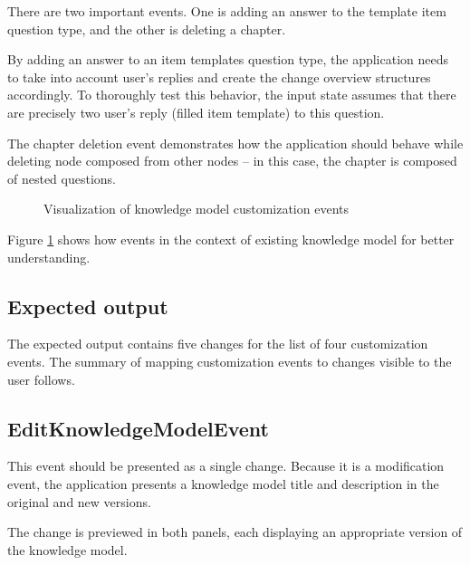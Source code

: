 There are two important events.
One is adding an answer to the template item question type, and the other is deleting a chapter.

By adding an answer to an item templates question type, the application needs to take into account user's replies and create the change overview structures accordingly.
To thoroughly test this behavior, the input state assumes that there are precisely two user's reply (filled item template) to this question.

The chapter deletion event demonstrates how the application should behave while deleting node composed from other nodes -- in this case, the chapter is composed of nested questions.

\begin{figure}[H]
    \caption{Visualization of knowledge model customization events}\label{fig:cust-events}
\end{figure}

Figure \ref{fig:cust-events} shows how events in the context of existing knowledge model for better understanding.

\subsection{Expected output}

The expected output contains five changes for the list of four customization events.
The summary of mapping customization events to changes visible to the user follows.

\subsection*{EditKnowledgeModelEvent}

This event should be presented as a single change.
Because it is a modification event, the application presents a knowledge model title and description in the original and new versions.

The change is previewed in both panels, each displaying an appropriate version of the knowledge model.

